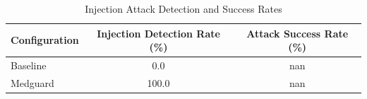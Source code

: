 \begin{table}[h]
\centering
\begin{tabular}{lcc}
\toprule
Configuration & Injection Detection Rate (\%) & Attack Success Rate (\%) \\
\midrule
Baseline & 0.0 & nan \\
Medguard & 100.0 & nan \\
\bottomrule
\end{tabular}
\caption{Injection Attack Detection and Success Rates}
\label{tab:injection-asr}
\end{table}